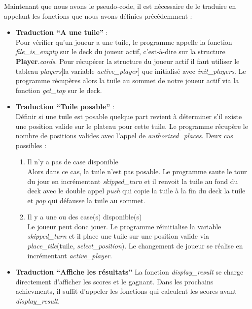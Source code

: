 \documentclass[a4paper]{article}
\begin{document}
Maintenant que nous avons le pseudo-code, il est nécessaire de le traduire en appelant les fonctions que nous avons définies précédemment : \\
\begin{itemize}
\item \textbf{Traduction ``A une tuile''} : \\
  Pour vérifier qu'un joueur a une tuile, le programme appelle la fonction \emph{file\_is\_empty} sur le deck du joueur actif, c'est-à-dire sur la structure \textbf{Player}.\emph{cards}. Pour récupérer la structure du joueur actif il faut utiliser le tableau \emph{players}[la variable \emph{active\_player}] que initialisé avec \emph{init\_players}. Le programme récupères alors la tuile au sommet de notre joueur actif via la fonction \emph{get\_top} sur le deck. \\
\item \textbf{Traduction ``Tuile posable''} : \\
  Définir si une tuile est posable quelque part revient à déterminer s'il existe une position valide sur le plateau pour cette tuile. Le programme récupère le nombre de positions valides avec l'appel de \emph{authorized\_places}. Deux cas possibles :
  \begin{enumerate}
  \item Il n'y a pas de case disponible \\
    Alors dans ce cas, la tuile n'est pas posable. Le programme saute le tour du jour en incrémentant \emph{skipped\_turn} et il renvoit la tuile au fond du deck avec le double appel \emph{push} qui copie la tuile à la fin du deck la tuile et \emph{pop} qui défausse la tuile au sommet.
  \item Il y a une ou des case(s) disponible(s) \\
    Le joueur peut donc jouer. Le programme réinitialise la variable \emph{skipped\_turn} et il place une tuile sur une position valide via \emph{place\_tile}(tuile, \emph{select\_position}). Le changement de joueur se réalise en incrémentant \emph{active\_player}. \\
  \end{enumerate}
\item \textbf{Traduction ``Affiche les résultats''}
  La fonction \emph{display\_result} se charge directement d'afficher les scores et le gagnant. Dans les prochains achievments, il suffit d'appeler les fonctions qui calculent les scores avant \emph{display\_result}. \\
\end{itemize}
\end{document}
